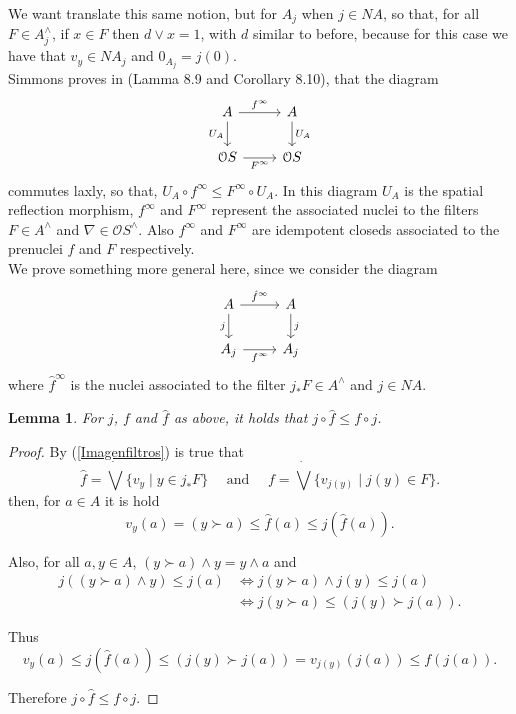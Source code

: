 \documentclass[11pt]{amsart}
\theoremstyle{plain}
\newtheorem{lem}[thm]{Lemma}
\theoremstyle{definition}
\begin{document}
We want translate this same notion, but for $A_j$ when $j\in NA$, so that, for all $F\in A_j^\wedge$, if $x\in F$ then $d\vee x=1$, with $d$ similar to before, because for this case we have that $v_y\in NA_j$ and $0_{A_j}=j(0)$.\\

Simmons proves in \cite{simmons2004vietoris} (Lamma 8.9 and Corollary 8.10), that the diagram
\[\begin{tikzcd}
	A & A \\
	{\mathcal{O}S} & {\mathcal{O}S}
	\arrow["{f^\infty}", from=1-1, to=1-2]
	\arrow["{U_A}"', from=1-1, to=2-1]
	\arrow["{U_A}", from=1-2, to=2-2]
	\arrow["{F^\infty}"', from=2-1, to=2-2]
\end{tikzcd}\]
commutes laxly, so that, $U_A\circ f^\infty\leq F^\infty \circ U_A$. In this diagram $U_A$ is the spatial reflection morphism, $f^\infty$ and $F^\infty$ represent the associated nuclei to the filters $F\in A^\wedge$ and $\nabla\in \mathcal{O}S^\wedge$. Also $f^\infty$ and $F^\infty$ are idempotent closeds associated to the prenuclei $f$ and $F$ respectively.\\

We prove something more general here, since we consider the diagram
\[\begin{tikzcd}
	A & A \\
	{A_j} & {A_j}
	\arrow["{\hat{f}^\infty}", from=1-1, to=1-2]
	\arrow["j"', from=1-1, to=2-1]
	\arrow["j", from=1-2, to=2-2]
	\arrow["{f^\infty}"', from=2-1, to=2-2]
\end{tikzcd}\]
where $\hat{f}^\infty$ is the nuclei associated to the filter $j_*F\in A^\wedge$ and $j\in NA$.  

\begin{lem}\label{f1f}
    For $j$, $f$ and $\hat{f}$ as above, it holds that $j\circ \hat{f}\leq f\circ j$.
\end{lem}
\begin{proof}
    By (\ref{Imagenfiltros}) is true that
    \[
    \hat{f}=\dot{\bigvee}\{v_y\mid y\in j_*F\}\quad  \mbox{ and } \quad f=\dot{\bigvee}\{v_{j(y)}\mid j(y)\in F\}. 
    \]
then, for $a\in A$ it is hold
\[
v_y(a)=(y\succ a)\leq \hat{f}(a)\leq j(\hat{f}(a)).
\]

Also, for all $a, y\in A$, $(y\succ a)\wedge y=y\wedge a$ and
\[
\begin{split}
j((y\succ a)\wedge y)\leq j(a) & \Leftrightarrow j(y\succ a)\wedge j(y)\leq j(a)\\
& \Leftrightarrow j(y\succ a)\leq (j(y)\succ j(a)).
\end{split}
\]

Thus 
\[
v_y(a)\leq j(\hat{f}(a))\leq (j(y)\succ j(a))=v_{j(y)}(j(a))\leq f(j(a)).
\]

Therefore $j\circ \hat{f}\leq f\circ j$.
\end{proof}
\end{document}
